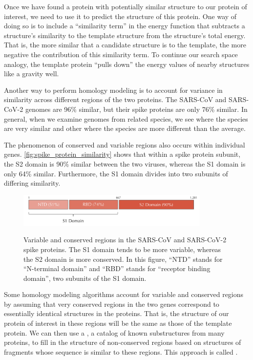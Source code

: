 Once we have found a protein with potentially similar structure to our protein of interest, we need to use it to predict the structure of this protein. One way of doing so is to include a ``similarity term'' in the energy function that subtracts a structure's similarity to the template structure from the structure's total energy. That is, the more similar that a candidate structure is to the template, the more negative the contribution of this similarity term. To continue our search space analogy, the template protein ``pulls down'' the energy values of nearby structures like a gravity well.

Another way to perform homology modeling is to account for variance in similarity across different regions of the two proteins. The SARS-CoV and SARS-CoV-2 genomes are 96\% similar, but their spike proteins are only 76\% similar. In general, when we examine genomes from related species, we see  where the species are very similar and other  where the species are more different than the average.

The phenomenon of conserved and variable regions also occurs within individual genes. \autoref{fig:spike_protein_similarity} shows that within a spike protein subunit, the S2 domain is 90\% similar between the two viruses, whereas the S1 domain is only 64\% similar. Furthermore, the S1 domain divides into two subunits of differing similarity.

\begin{figure}[h]
	\centering
	\mySfFamily
	\includegraphics[width = 0.85\textwidth]{../images/spike_protein_similarity.png}\\
	\caption{Variable and conserved regions in the SARS-CoV and SARS-CoV-2 spike proteins. The S1 domain tends to be more variable, whereas the S2 domain is more conserved. In this figure, ``NTD'' stands for ``N-terminal domain'' and ``RBD'' stands for ``receptor binding domain'', two subunits of the S1 domain.}
	\label{fig:spike_protein_similarity}
\end{figure}

Some homology modeling algorithms account for variable and conserved regions by assuming that very conserved regions in the two genes correspond to essentially identical structures in the proteins. That is, the structure of our protein of interest in these regions will be the same as those of the template protein. We can then use a , a catalog of known substructures from many proteins, to fill in the structure of non-conserved regions based on structures of fragments whose sequence is similar to these regions. This approach is called .

